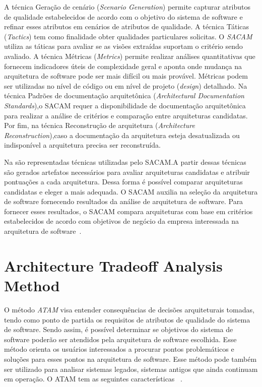 A técnica Geração de cenário (\emph{Scenario Generation}) permite capturar atributos de qualidade estabelecidos de acordo com o objetivo do sistema de software  e refinar esses atributos em cenários de atributos de qualidade. A técnica Táticas (\emph{Tactics}) tem como finalidade  obter qualidades particulares solicitas.
O \emph{\acrfull{SACAM}} utiliza as táticas para avaliar se as visões extraídas suportam o critério sendo avaliado.
A técnica Métricas (\emph{Metrics}) permite realizar análises quantitativas que fornecem indicadores úteis de complexidade geral e aponta onde  mudança na arquitetura de software pode ser mais difícil ou mais provável. 
Métricas podem ser utilizadas no nível de código ou em  nível de projeto (\emph{design}) detalhado. Na técnica Padrões de documentação arquitetônica (\emph{Architectural Documentation Standards}),o SACAM requer a disponibilidade de documentação arquitetônica para realizar a análise de critérios e comparação entre arquiteturas candidatas. Por fim, na técnica Reconstrução de arquitetura (\emph{Architecture Reconstruction}),caso a documentação da arquitetura esteja desatualizada ou indisponível a arquitetura precisa ser reconstruída. 

%

Na  são representadas técnicas utilizadas pelo SACAM.A partir dessas técnicas são gerados artefatos necessários para avaliar arquiteturas candidatas e atribuir pontuações a cada arquitetura. Dessa forma é possível comparar arquiteturas candidatas e eleger a mais adequada. O SACAM auxilia na seleção da arquitetura de software fornecendo resultados da análise de arquitetura de software. Para fornecer esses resultados, o SACAM compara arquiteturas com base em critérios estabelecidos de acordo com objetivos de negócio da empresa interessada na arquitetura de software~\cite{SACAM}. 

\section{Architecture Tradeoff Analysis Method}

O método \emph{\acrfull{ATAM}} visa entender  consequências de decisões arquiteturais tomadas, tendo como ponto de partida os requisitos de atributos de qualidade do sistema de software. Sendo assim, é possível determinar se objetivos do sistema de software poderão ser atendidos pela arquitetura de software escolhida. Esse método orienta os usuários interessados a procurar pontos problemáticos e soluções para esses pontos na arquitetura de software. Esse método pode também ser utilizado para analisar sistemas legados, sistemas antigos que ainda continuam em operação. O ATAM tem as seguintes características ~\cite{ATAM}. 

